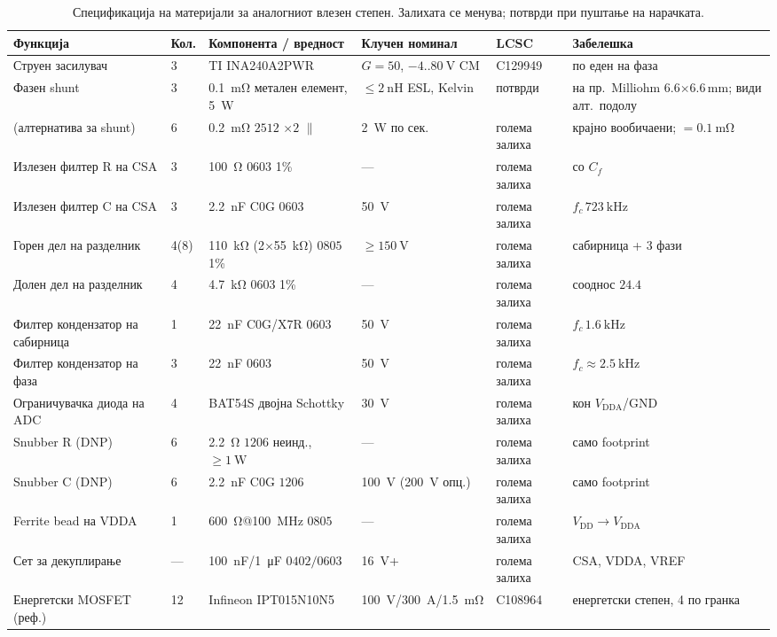 \documentclass[journal,onecolumn,11pt]{IEEEtran}
\begin{document}
\begin{table}[t]
\centering
\caption{Спецификација на материјали за аналогниот влезен степен. Залихата се менува; потврди при пуштање на нарачката.}
\label{tab:bom}
\small
\renewcommand{\arraystretch}{1.2}
\begin{tabular}{p{3.1cm} p{1.0cm} p{3.2cm} p{2.6cm} p{2.0cm} p{2.7cm}}
\toprule
\textbf{Функција} & \textbf{Кол.} & \textbf{Компонента / вредност} & \textbf{Клучен номинал} & \textbf{LCSC} & \textbf{Забелешка}\\
\midrule
Струен засилувач & 3 & TI INA240A2PWR & $G{=}50$, $-4..\SI{80}{\volt}$ CM & C129949 & по еден на фаза~\cite{lcsc_ina}\\
Фазен shunt & 3 & \SI{0.1}{\milli\ohm} метален елемент, \SI{5}{\watt} & $\le\SI{2}{\nano\henry}$ ESL, Kelvin & потврди & на пр.\ Milliohm 6.6$\times$6.6\,mm; види алт.\ подолу~\cite{lcsc_shunt}\\
\;\;(алтернатива за shunt) & 6 & \SI{0.2}{\milli\ohm} \(2512\) $\times2$ \(\parallel\) & \SI{2}{\watt} по сек. & голема залиха & крајно вообичаени; $=\SI{0.1}{\milli\ohm}$\\
Излезен филтер R на CSA & 3 & \SI{100}{\ohm} \(0603\) 1\% & --- & голема залиха & со $C_f$\\
Излезен филтер C на CSA & 3 & \SI{2.2}{\nano\farad} C0G \(0603\) & \SI{50}{\volt} & голема залиха & $f_c\,\SI{723}{\kilo\hertz}$\\
Горен дел на разделник & 4(8) & \SI{110}{\kilo\ohm} (2$\times$\SI{55}{\kilo\ohm}) \(0805\) 1\% & $\ge\SI{150}{\volt}$ & голема залиха & сабирница + 3 фази\\
Долен дел на разделник & 4 & \SI{4.7}{\kilo\ohm} \(0603\) 1\% & --- & голема залиха & сооднос $24.4$\\
Филтер кондензатор на сабирница & 1 & \SI{22}{\nano\farad} C0G/X7R \(0603\) & \SI{50}{\volt} & голема залиха & $f_c\,\SI{1.6}{\kilo\hertz}$\\
Филтер кондензатор на фаза & 3 & \SI{22}{\nano\farad} \(0603\) & \SI{50}{\volt} & голема залиха & $f_c\approx\SI{2.5}{\kilo\hertz}$\\
Ограничувачка диода на ADC & 4 & BAT54S двојна Schottky & \SI{30}{\volt} & голема залиха & кон $V_{\mathrm{DDA}}$/GND\\
Snubber R (DNP) & 6 & \SI{2.2}{\ohm} \(1206\) неинд., $\ge\SI{1}{\watt}$ & --- & голема залиха & само footprint\\
Snubber C (DNP) & 6 & \SI{2.2}{\nano\farad} C0G \(1206\) & \SI{100}{\volt} (\SI{200}{\volt} опц.) & голема залиха & само footprint\\
Ferrite bead на VDDA & 1 & \SI{600}{\ohm}@\SI{100}{\mega\hertz} \(0805\) & --- & голема залиха & $V_{\mathrm{DD}}\!\to\!V_{\mathrm{DDA}}$\\
Сет за декуплирање & --- & \SI{100}{\nano\farad}/\SI{1}{\micro\farad} \(0402/0603\) & \SI{16}{\volt}+ & голема залиха & CSA, VDDA, VREF\\
Енергетски MOSFET (реф.) & 12 & Infineon IPT015N10N5 & \SI{100}{\volt}/\SI{300}{\ampere}/\SI{1.5}{\milli\ohm} & C108964 & енергетски степен, 4 по гранка~\cite{lcsc_ipt}\\
\bottomrule
\end{tabular}
\end{table}
\end{document}
